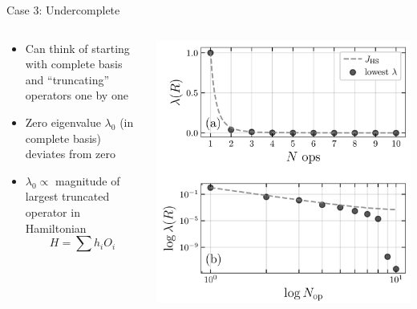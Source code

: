 \documentclass{beamer}
\begin{document}
\begin{frame}{Case 3: Undercomplete}
\begin{columns}
\begin{column}{0.5\textwidth}
\begin{itemize}
	\item<+-> Can think of starting with complete basis and ``truncating'' 
		operators one by one
	\item<+-> Zero eigenvalue $ \lambda_0 $ (in complete basis) deviates from zero
	\item<+-> $\lambda_0 \propto $ magnitude of largest truncated operator in Hamiltonian 
	\begin{equation*}
		H = \sum h_i O_i
	\end{equation*}
\end{itemize}
\end{column}
\begin{column}{0.5\textwidth}
\includegraphics[width=\textwidth]{figs/hs-recon.jpg}
\end{column}
\end{columns}
\end{frame}
\end{document}
